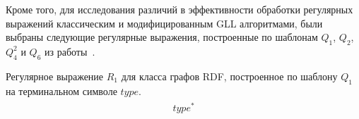 
Кроме того, для исследования различий в эффективности обработки регулярных выражений классическим и модифицированным GLL алгоритмами, были выбраны следующие регулярные выражения, построенные по шаблонам $Q_1$, $Q_2$, $Q_{4}^{2}$ и $Q_6$ из работы~\cite{regex}. 

\begin{ruexample}
    Регулярное выражение $R_1$ для класса графов RDF, построенное по шаблону $Q_1$ на терминальном символе $type$.
\begin{align}
\begin{split}
\label{reg:rdf_reg_1}
type^*
\end{split}
\end{align}
\end{ruexample}

